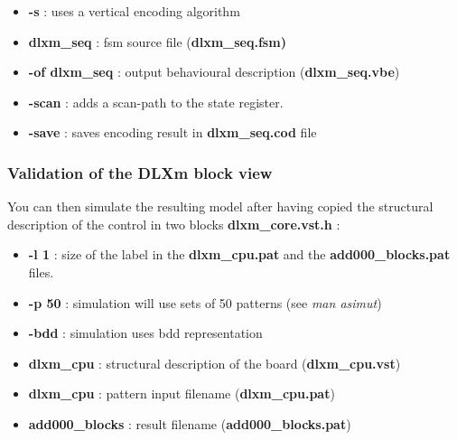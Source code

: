 
\begin {itemize}
\item {\bf -s} : uses a vertical encoding algorithm
\item
{\bf dlxm\_seq} : fsm source file ({\bf dlxm\_seq.fsm)}
\item  
{\bf -of dlxm\_seq} : output behavioural description ({\bf dlxm\_seq.vbe})
\item
{\bf -scan} : adds a scan-path to the state register.
\item
{\bf -save} : saves encoding result in {\bf dlxm\_seq.cod} file
\end{itemize}

		\subsubsection{Validation of the DLXm block view}

You can then simulate the resulting model after having copied the
structural description of the control in two blocks {\bf
dlxm\_core.vst.h} :




\begin{itemize} 
\item
{\bf -l 1} : size of the label in the {\bf dlxm\_cpu.pat} and the {\bf
add000\_blocks.pat} files.
\item 
{\bf -p 50} : simulation will use sets of 50 patterns (see {\it man
asimut})
\item
{\bf -bdd} : simulation uses bdd representation
\item
{\bf dlxm\_cpu} : structural description of the board  ({\bf dlxm\_cpu.vst}) 
\item
{\bf dlxm\_cpu} : pattern input filename ({\bf dlxm\_cpu.pat}) 
\item
{\bf add000\_blocks} : result filename ({\bf add000\_blocks.pat}) 
\end{itemize}

